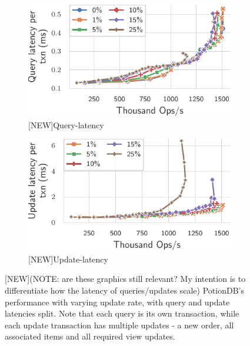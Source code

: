 \documentclass[sigplan,10pt]{acmart}
\begin{document}
\begin{figure}[h]
	\centering
	\begin{subfigure}{.47\linewidth}
		\includegraphics[width=1\linewidth]{singleQuery/query_latency_global_noTC}
		\caption{[NEW]Query-latency}
		\label{fig:(new)query_latency_noTC}
	\end{subfigure}%
	\hspace*{3em}
	\begin{subfigure}{.47\linewidth}
		\includegraphics[width=1\linewidth]{singleQuery/upd_latency_global_noTC}
		\caption{[NEW]Update-latency}
		\label{fig:(new)update_latency_noTC}
	\end{subfigure}
	\caption{[NEW](NOTE: are these graphics still relevant? My intention is to differentiate how the latency of queries/updates scale) PotionDB's performance with varying update rate, with query and update latencies split. Note that each query is its own transaction, while each update transaction has multiple updates - a new order, all associated items and all required view updates.}
\end{figure}
\end{document}
